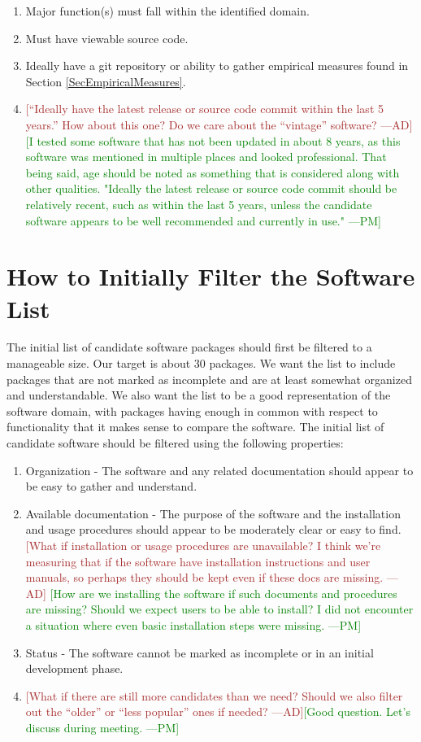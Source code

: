 \documentclass[letterpaper,cleveref]{lipics-v2019}
\newcommand{\authornote}[3]{\textcolor{#1}{[#3 ---#2]}}
\newcommand{\authornote}[3]{}
\newcommand{\pmi}[1]{\authornote{green}{PM}{#1}} %
\newcommand{\ad}[1]{\authornote{brown}{AD}{#1}} %
\theoremstyle{definition}
\begin{document}
\begin{enumerate}
	\item Major function(s) must fall within the identified domain.
	\item Must have viewable source code.
	\item Ideally have a git repository or ability to gather empirical measures found in Section \ref{SecEmpiricalMeasures}.
	\item \ad{``Ideally have the latest release or source code commit within the last 5 years.'' How about this one? Do we care about the ``vintage'' software?}\pmi{I tested some software that has not been updated in about 8 years, as this software was mentioned in multiple places and looked professional. That being said, age should be noted as something that is considered along with other qualities. "Ideally the latest release or source code commit should be relatively recent, such as within the last 5 years, unless the candidate software appears to be well recommended and currently in use."}
\end{enumerate}

\section{How to Initially Filter the Software List} \label{SecInitialFilter}
The initial list of candidate software packages should first be filtered to a manageable size. Our target is about 30 packages. We want the list to include packages that are not marked as incomplete and are at least somewhat organized and understandable. We also want the list to be a good representation of the software domain, with packages having enough in common with respect to functionality that it makes sense to compare the software. The initial list of candidate software should be filtered using the following properties:

\begin{enumerate}
	\item Organization - The software and any related documentation should appear to be easy to gather and understand.
	\item Available documentation - The purpose of the software and the installation and usage procedures should appear to be moderately clear or easy to find.
	\ad{What if installation or usage procedures are unavailable? I think we're measuring that if the software have installation instructions and user manuals,
	so perhaps they should be kept even if these docs are missing.}
    \pmi{How are we installing the software if such documents and procedures are missing? Should we expect users to be able to install? I did not encounter a situation where even basic installation steps were missing.}
	\item Status - The software cannot be marked as incomplete or in an initial development phase.
	\item \ad{What if there are still more candidates than we need? Should we also filter out the ``older'' or ``less popular'' ones if needed? }\pmi{Good question. Let's discuss during meeting.}
\end{enumerate}
\end{document}
